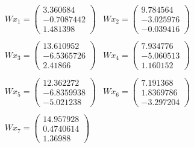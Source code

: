 \documentclass{article}
\begin{document}
\begin{align*}
    \begin{array}{ll}
        W x_1 = \left(
        \begin{array}{c}
            3.360684\\
            -0.7087442\\
            1.481398
        \end{array}
        \right) &
        W x_2 = \left(
        \begin{array}{c}
            9.784564\\
            -3.025976\\
            -0.039416
        \end{array}
        \right)\\
        & \\
        W x_3 = \left(
        \begin{array}{c}
            13.610952\\
            -6.5365726\\
            2.41866
        \end{array}
        \right) & 
        W x_4 = \left(
        \begin{array}{c}
            7.934776\\
            -5.060513\\
            1.160152
        \end{array}
        \right)\\
        & \\
        W x_5 = \left(
        \begin{array}{c}
            12.362272\\
            -6.8359938\\
            -5.021238
        \end{array}
        \right) & 
        W x_6 = \left(
        \begin{array}{c}
            7.191368\\
            1.8369786\\
            -3.297204
        \end{array}
        \right)\\
        & \\
        W x_7 = \left(
        \begin{array}{c}
            14.957928\\
            0.4740614\\
            1.36988
        \end{array}
        \right) & 

\end{array}
\end{align*}
\end{document}
